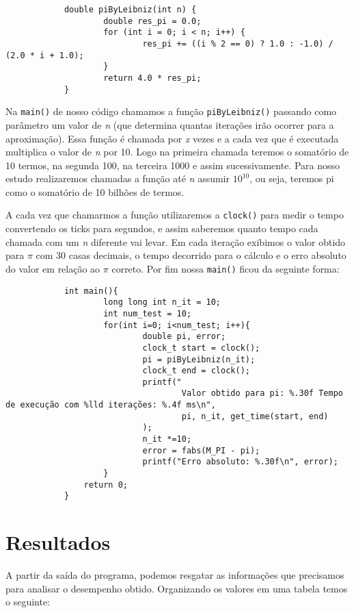 \documentclass[a4paper, 12pt]{article}
\begin{document}
		\begin{verbatim}
			double piByLeibniz(int n) {
					double res_pi = 0.0;
					for (int i = 0; i < n; i++) {
							res_pi += ((i % 2 == 0) ? 1.0 : -1.0) / (2.0 * i + 1.0);
					}
					return 4.0 * res_pi;
			}
		\end{verbatim}
		
		Na \texttt{main()} de nosso código chamamos a função \texttt{piByLeibniz()} passando como parâmetro um valor de \textit{n} (que determina quantas iterações irão ocorrer para a aproximação). Essa função é chamada por \textit{x} vezes e a cada vez que é executada multiplica o valor de \textit{n} por 10. Logo na primeira chamada teremos o somatório de 10 termos, na segunda 100, na terceira 1000 e assim sucessivamente. Para nosso estudo realizaremos chamadas a função até \textit{n} assumir \( 10^{10} \), ou seja, teremos pi como o somatório de 10 bilhões de termos.
		
		A cada vez que chamarmos a função utilizaremos a \texttt{clock()} para medir o tempo convertendo os ticks para segundos, e assim saberemos quanto tempo cada chamada com um \textit{n} diferente vai levar. Em cada iteração exibimos o valor obtido para $\pi$ com 30 casas decimais, o tempo decorrido para o cálculo e o erro absoluto do valor em relação ao $\pi$ correto. Por fim nossa \texttt{main()} ficou da seguinte forma:
		
		\begin{verbatim}
			int main(){
					long long int n_it = 10;
					int num_test = 10;
					for(int i=0; i<num_test; i++){
							double pi, error;
							clock_t start = clock();
							pi = piByLeibniz(n_it);
							clock_t end = clock();
							printf("
									Valor obtido para pi: %.30f Tempo de execução com %lld iterações: %.4f ms\n",
									pi, n_it, get_time(start, end)
							);
							n_it *=10;
							error = fabs(M_PI - pi);
							printf("Erro absoluto: %.30f\n", error);
					}
				return 0;
			}
		\end{verbatim}
		
	\section{Resultados}
		\hspace{.6cm}A partir da saída do programa, podemos resgatar as informações que precisamos para analisar o desempenho obtido. Organizando os valores em uma tabela temos o seguinte:
		
\end{document}
